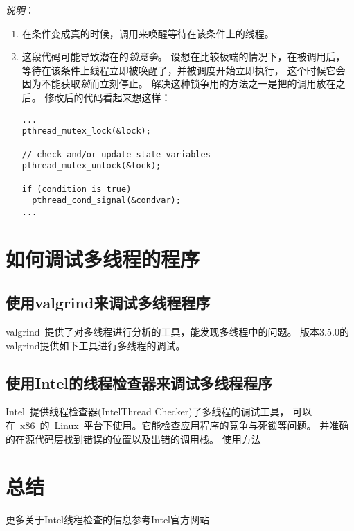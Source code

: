 \emph{说明}：
\begin{enumerate}
\item 在条件变成真的时候，调用来唤醒等待在该条件上的线程。
\item 这段代码可能导致潜在的\emph{锁竞争}。
设想在比较极端的情况下，在被调用后，
等待在该条件上线程立即被唤醒了，并被调度开始立即执行，
这个时候它会因为不能获取\emph{锁}而立刻停止。
解决这种锁争用的方法之一是把的调用放在之后。
修改后的代码看起来想这样：
\begin{lstlisting}
...
pthread_mutex_lock(&lock);

// check and/or update state variables
pthread_mutex_unlock(&lock);

if (condition is true)
  pthread_cond_signal(&condvar);
...
\end{lstlisting}
\end{enumerate}





\section{如何调试多线程的程序}

\subsection{使用valgrind来调试多线程程序}
valgrind~提供了对多线程进行分析的工具，能发现多线程中的问题。
版本3.5.0的valgrind提供如下工具进行多线程的调试。

\subsection{使用Intel的线程检查器来调试多线程程序} 
Intel~提供线程检查器(Intel\textregistered Thread Checker)了多线程的调试工具，
可以在~x86~的~Linux~平台下使用。它能检查应用程序的竞争与死锁等问题。
并准确的在源代码层找到错误的位置以及出错的调用栈。
使用方法


\section{总结}

更多关于Intel线程检查的信息参考Intel官方网站\cite{intel-thread-checker}

